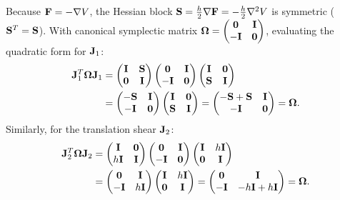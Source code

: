 \documentclass[../main.tex]{subfiles}
\begin{document}
{Because $\mathbf{F}=-\nabla V$, the Hessian block $\mathbf{S} = \frac{h}{2}\nabla\mathbf{F} = -\frac{h}{2}\nabla^2V$ is symmetric ($\mathbf{S}^T = \mathbf{S}$).
With canonical symplectic matrix $\boldsymbol{\Omega} = \begin{pmatrix} \mathbf{0} & \mathbf{I} \\ -\mathbf{I} & \mathbf{0} \end{pmatrix}$, evaluating the quadratic form for $\mathbf{J}_1$:
\begin{align*}
    \mathbf{J}_1^T \boldsymbol{\Omega} \mathbf{J}_1 &= \begin{pmatrix} \mathbf{I} & \mathbf{S} \\ \mathbf{0} & \mathbf{I} \end{pmatrix} \begin{pmatrix} \mathbf{0} & \mathbf{I} \\ -\mathbf{I} & \mathbf{0} \end{pmatrix} \begin{pmatrix} \mathbf{I} & \mathbf{0} \\ \mathbf{S} & \mathbf{I} \end{pmatrix} \\
    &= \begin{pmatrix} -\mathbf{S} & \mathbf{I} \\ -\mathbf{I} & \mathbf{0} \end{pmatrix} \begin{pmatrix} \mathbf{I} & \mathbf{0} \\ \mathbf{S} & \mathbf{I} \end{pmatrix} = \begin{pmatrix} -\mathbf{S} + \mathbf{S} & \mathbf{I} \\ -\mathbf{I} & \mathbf{0} \end{pmatrix} = \boldsymbol{\Omega}.
\end{align*}
Similarly, for the translation shear $\mathbf{J}_2$:
\begin{align*}
    \bJ_2^T \boldsymbol{\Omega} \bJ_2 &= \begin{pmatrix} \bI & \bzero \\ h\bI & \bI \end{pmatrix} \begin{pmatrix} \bzero & \bI \\ -\bI & \bzero \end{pmatrix} \begin{pmatrix} \bI & h\bI \\ \bzero & \bI \end{pmatrix} \\
    &= \begin{pmatrix} \bzero & \bI \\ -\bI & h\bI \end{pmatrix} \begin{pmatrix} \bI & h\bI \\ \bzero & \bI \end{pmatrix} = \begin{pmatrix} \bzero & \bI \\ -\bI & -h\bI + h\bI \end{pmatrix} = \boldsymbol{\Omega}.

\end{align*}}
\end{document}

